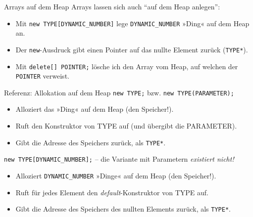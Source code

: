 \begin{frame}[fragile]{Arrays auf dem Heap}
	Arrays lassen sich auch \enquote{auf dem Heap anlegen}:
	
	\begin{itemize}[<+->]
		\item Mit \verb|new TYPE[DYNAMIC_NUMBER]| lege \verb|DYNAMIC_NUMBER| »Ding« auf dem Heap an.
		\item Der \verb|new|-Ausdruck gibt einen Pointer auf das nullte Element zurück (\verb|TYPE*|).
		\item Mit \verb|delete[] POINTER;| lösche ich den Array vom Heap, auf welchen der \verb|POINTER| verweist.
	\end{itemize}
\end{frame}


{
\begin{frame}[fragile]{Referenz: Allokation auf dem Heap}
	\verb|new TYPE;| \hspace{1em} bzw. \hspace{1em} \verb|new TYPE(PARAMETER);|
	\begin{itemize}
		\item Alloziert das »Ding« auf dem Heap (den Speicher!).
		\item Ruft den Konstruktor von TYPE auf (und übergibt die PARAMETER).
		\item Gibt die Adresse des Speichers zurück, als \verb|TYPE*|.
	\end{itemize}
	
	\vspace{2em}
	
	\verb|new TYPE[DYNAMIC_NUMBER];| -- die Variante mit Parametern \emph{existiert nicht!}
	\begin{itemize}
		\item Alloziert \verb|DYNAMIC_NUMBER| »Dinge« auf dem Heap (den Speicher!).
		\item Ruft für jedes Element den \emph{default}-Konstruktor von TYPE auf.
		\item Gibt die Adresse des Speichers des nullten Elements zurück, als \verb|TYPE*|.
	\end{itemize}
\end{frame}
}

